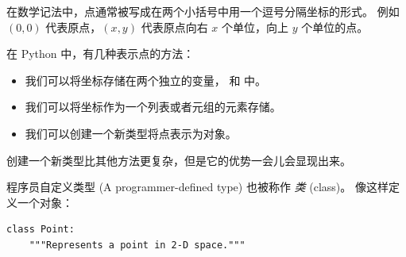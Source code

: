 
在数学记法中，点通常被写成在两个小括号中用一个逗号分隔坐标的形式。
例如 $(0,0)$ 代表原点，$(x,y)$ 代表原点向右 $x$ 个单位，向上 $y$ 个单位的点。


在 Python 中，有几种表示点的方法：

\begin{itemize}


\item 我们可以将坐标存储在两个独立的变量， 和  中。


\item 我们可以将坐标作为一个列表或者元组的元素存储。


\item 我们可以创建一个新类型将点表示为对象。

\end{itemize}


创建一个新类型比其他方法更复杂，但是它的优势一会儿会显现出来。


程序员自定义类型 (A programmer-defined type) 也被称作 {\em 类} (class)。  像这样定义一个对象：

  
  

\begin{lstlisting}
class Point:
    """Represents a point in 2-D space."""
\end{lstlisting}

